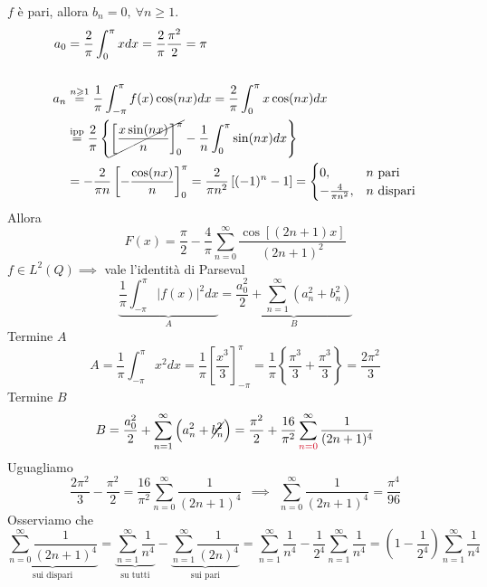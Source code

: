 $f$ è pari, allora $b_{n} =0,\ \forall n\geqslant 1$.
\begin{align*}
a_{0} & =\frac{2}{\pi }\int ^{\pi }_{0} xdx=\frac{2}{\pi }\frac{\pi ^{2}}{2} =\pi \\
 & \\
a_{n} & \overset{n\geqslant 1}{=}\frac{1}{\pi }\int ^{\pi }_{-\pi } f( x)\cos( nx) dx=\frac{2}{\pi }\int ^{\pi }_{0} x\cos( nx) dx\\
 & \overset{\text{ipp}}{=}\frac{2}{\pi }\left\{\cancel{\left[\frac{x\sin( nx)}{n}\right]^{\pi }_{0}} -\frac{1}{n}\int ^{\pi }_{0}\sin( nx) dx\right\}\\
 & =-\frac{2}{\pi n}\left[ -\frac{\cos( nx)}{n}\right]^{\pi }_{0} =\frac{2}{\pi n^{2}}\left[( -1)^{n} -1\right] =\begin{cases}
0, & n\ \text{pari}\\
-\frac{4}{\pi n^{2}} , & n\ \text{dispari}
\end{cases}
\end{align*}
Allora
\begin{equation*}
F( x) =\frac{\pi }{2} -\frac{4}{\pi }\sum\limits ^{\infty }_{n=0}\frac{\cos[( 2n+1) x]}{( 2n+1)^{2}}
\end{equation*}
$f\in L^{2}( Q) \implies $ vale l'identità di Parseval
\begin{equation*}
\underbrace{\frac{1}{\pi }\int ^{\pi }_{-\pi }| f( x)| ^{2} dx}_{A} =\underbrace{\frac{a^{2}_{0}}{2} +\sum\limits ^{\infty }_{n=1}\left( a^{2}_{n} +b^{2}_{n}\right)}_{B}
\end{equation*}
Termine $A$
\begin{equation*}
A=\frac{1}{\pi }\int ^{\pi }_{-\pi } x^{2} dx=\frac{1}{\pi }\left[\frac{x^{3}}{3}\right]^{\pi }_{-\pi } =\frac{1}{\pi }\left\{\frac{\pi ^{3}}{3} +\frac{\pi ^{3}}{3}\right\} =\frac{2\pi ^{2}}{3}
\end{equation*}
Termine $B$
\begin{equation*}
B=\frac{a^{2}_{0}}{2} +\sum\limits ^{\infty }_{n=1}\left( a^{2}_{n} +\cancel{b^{2}_{n}}\right) =\frac{\pi ^{2}}{2} +\frac{16}{\pi ^{2}}\sum\limits ^{\infty }_{\textcolor[rgb]{0.82,0.01,0.11}{n=0}}\frac{1}{( 2n+1)^{4}}
\end{equation*}
Uguagliamo
\begin{equation*}
\frac{2\pi ^{2}}{3} -\frac{\pi ^{2}}{2} =\frac{16}{\pi ^{2}}\sum\limits ^{\infty }_{n=0}\frac{1}{( 2n+1)^{4}} \ \ \implies \ \ \sum\limits ^{\infty }_{n=0}\frac{1}{( 2n+1)^{4}} =\frac{\pi ^{4}}{96}
\end{equation*}
Osserviamo che
\begin{equation*}
\underbrace{\sum\limits ^{\infty }_{n=0}\frac{1}{( 2n+1)^{4}}}_{\text{sui dispari}} =\underbrace{\sum\limits ^{\infty }_{n=1}\frac{1}{n^{4}}}_{\text{su tutti}} -\underbrace{\sum\limits ^{\infty }_{n=1}\frac{1}{( 2n)^{4}}}_{\text{sui pari}} =\sum\limits ^{\infty }_{n=1}\frac{1}{n^{4}} -\frac{1}{2^{4}}\sum\limits ^{\infty }_{n=1}\frac{1}{n^{4}} =\left( 1-\frac{1}{2^{4}}\right)\sum\limits ^{\infty }_{n=1}\frac{1}{n^{4}}
\end{equation*}
